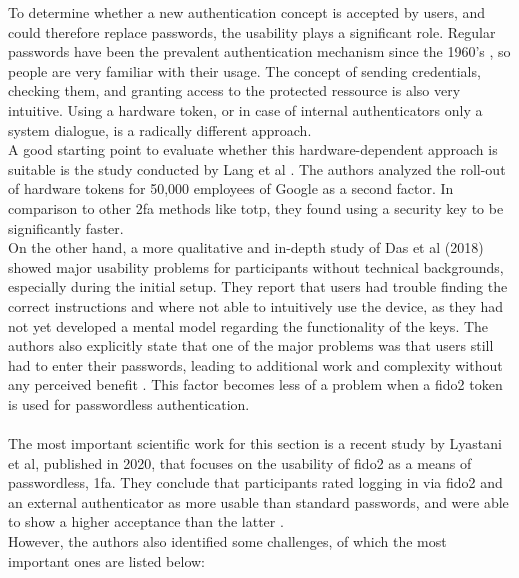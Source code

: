 To determine whether a new authentication concept is accepted by users, and could therefore replace passwords, the usability plays a significant role. Regular passwords have been the prevalent authentication mechanism since the 1960's \cite{mcmillan2012}, so people are very familiar with their usage. The concept of sending credentials, checking them, and granting access to the protected ressource is also very intuitive. Using a hardware token, or in case of internal authenticators only a system dialogue, is a radically different approach.\\
A good starting point to evaluate whether this hardware-dependent approach is suitable is the study conducted by Lang et al \cite{lang2017}. The authors analyzed the roll-out of hardware tokens for 50,000 employees of Google as a second factor. In comparison to other \ac{2fa} methods like \ac{totp}, they found using a security key to be significantly faster.\\
On the other hand, a more qualitative and in-depth study of Das et al (2018) showed major usability problems for participants without technical backgrounds, especially during the initial setup. They report that users had trouble finding the correct instructions and where not able to intuitively use the device, as they had not yet developed a mental model regarding the functionality of the keys. The authors also explicitly state that one of the major problems was that users still had to enter their passwords, leading to additional work and complexity without any perceived benefit \cite{das2018}. This factor becomes less of a problem when a \ac{fido2} token is used for passwordless authentication.\\
\\
The most important scientific work for this section is a recent study by Lyastani et al, published in 2020, that focuses on the usability of \ac{fido2} as a means of passwordless, \ac{1fa}. They conclude that participants rated logging in via \ac{fido2} and an external authenticator as more usable than standard passwords, and were able to show a higher acceptance than the latter \cite{lyastani2020}.\\
However, the authors also identified some challenges, of which the most important ones are listed below:

